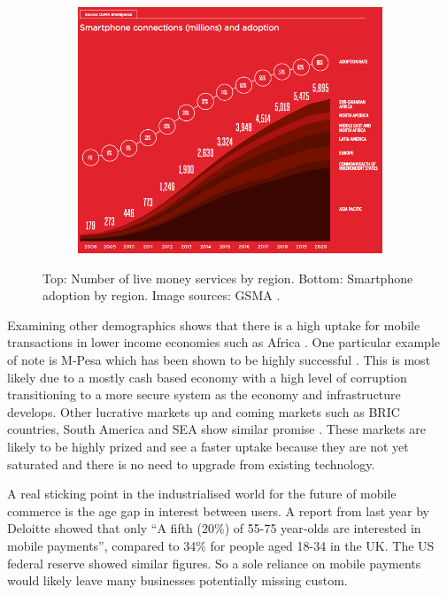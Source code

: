 \documentclass[paper=a4, fontsize=12pt]{scrartcl}	%
\numberwithin{equation}{section}															%
\numberwithin{figure}{section}																%
\numberwithin{table}{section}
\begin{document}
\begin{figure}[H]
    \begin{subfigure}[b]{0.7\textwidth}
        \includegraphics[width=\textwidth]{img/marketgrowth.png}
    \end{subfigure}
    
    \caption{Top: Number of live money services by region. Bottom: Smartphone adoption by region. Image sources: GSMA \cite{gsma2015mobile}.}
    
    \label{fig:mobile-commerce}
\end{figure}


Examining other demographics shows that there is a high uptake for mobile transactions in lower income economies such as Africa \cite{allafrica2016nigeria}. One particular example of note is M-Pesa \cite{mpesa2015mpesa} which has been shown to be highly successful \cite{economist2015why}. This is most likely due to a mostly cash based economy with a high level of corruption transitioning to a more secure system as the economy and infrastructure develops. Other lucrative markets up and coming markets such as BRIC countries, South America and SEA show similar promise \cite{gsma2015mobile}. These markets are likely to be highly prized and see a faster uptake because they are not yet saturated and there is no need to upgrade from existing technology.

A real sticking point in the industrialised world for the future of mobile commerce is the age gap in interest between users. A report from last year by Deloitte \cite{deloitte2015britain} showed that only ``A fifth (20\%) of 55-75 year-olds are interested in mobile payments'', compared to 34\% for people aged 18-34 in the UK. The US federal reserve \cite{federal2015consumers} showed similar figures. So a sole reliance on mobile payments would likely leave many businesses potentially missing custom.
\end{document}
